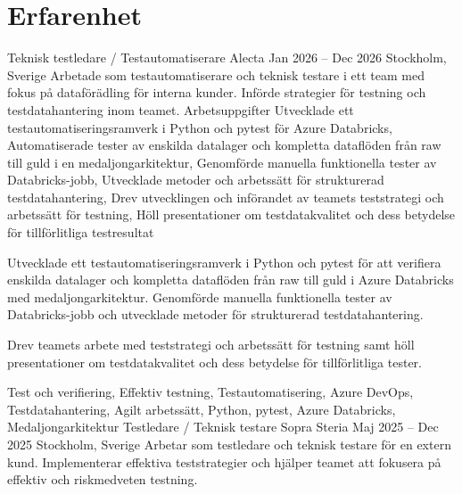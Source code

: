 \documentclass{sobCV}[2015/09/08]
\begin{document}
\section{Erfarenhet}

\experiencenode
{Teknisk testledare / Testautomatiserare}
{Alecta}
{Jan 2026 -- Dec 2026}
{Stockholm, Sverige}{
    Arbetade som testautomatiserare och teknisk testare i ett team med fokus
    på dataförädling för interna kunder. Införde strategier för testning och
    testdatahantering inom teamet.
}
{Arbetsuppgifter}{
    Utvecklade ett testautomatiseringsramverk i Python och pytest för Azure Databricks,
    Automatiserade tester av enskilda datalager och kompletta dataflöden från raw till guld i en medaljongarkitektur,
    Genomförde manuella funktionella tester av Databricks-jobb,
    Utvecklade metoder och arbetssätt för strukturerad testdatahantering,
    Drev utvecklingen och införandet av teamets teststrategi och arbetssätt för testning,
    Höll presentationer om testdatakvalitet och dess betydelse för tillförlitliga testresultat
}{  %
    {
        Utvecklade ett testautomatiseringsramverk i Python och pytest för att
        verifiera enskilda datalager och kompletta dataflöden från raw till
        guld i Azure Databricks med medaljongarkitektur. Genomförde manuella
        funktionella tester av Databricks-jobb och utvecklade metoder för
        strukturerad testdatahantering.

        Drev teamets arbete med teststrategi och arbetssätt för testning
        samt höll presentationer om testdatakvalitet och dess betydelse
        för tillförlitliga tester.
    }
}{
    Test och verifiering,
    Effektiv testning,
    Testautomatisering,
    Azure DevOps,
    Testdatahantering,
    Agilt arbetssätt,
    Python,
    pytest,
    Azure Databricks,
    Medaljongarkitektur
}
\experiencenode
   {Testledare / Teknisk testare}
   {Sopra Steria}
   {Maj 2025 -- Dec 2025}
   {Stockholm, Sverige}{
       Arbetar som testledare och teknisk testare för en extern kund.
       Implementerar effektiva teststrategier och hjälper teamet att fokusera
       på effektiv och riskmedveten testning.
   }
\end{document}
